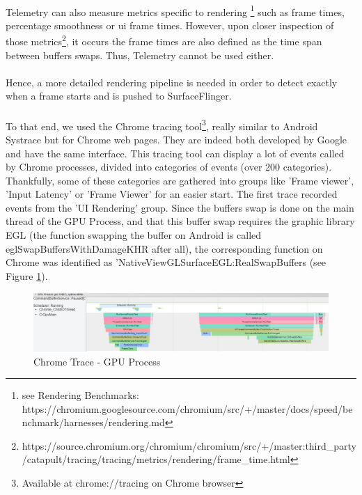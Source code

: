 \documentclass{kththesis}
\begin{document}
 \paragraph{}
 Telemetry can also measure metrics specific to rendering \footnote{see Rendering Benchmarks: https://chromium.googlesource.com/chromium/src/+/master/docs/speed/benchmark/harnesses/rendering.md} such as frame times, percentage smoothness or ui frame times. However, upon closer inspection of those metrics\footnote{https://source.chromium.org/chromium/chromium/src/+/master:third_party/catapult/tracing/tracing/metrics/rendering/frame_time.html}, it occurs the frame times are also defined as the time span between buffers swaps. Thus, Telemetry cannot be used either.
 
 \paragraph{}
 Hence, a more detailed rendering pipeline is needed in order to detect exactly when a frame starts and is pushed to SurfaceFlinger.
 
 \paragraph{}
 To that end, we used the Chrome tracing tool\footnote{Available at chrome://tracing on Chrome browser}, really similar to Android Systrace but for Chrome web pages. They are indeed both developed by Google and have the same interface. This tracing tool can display a lot of events called by Chrome processes, divided into categories of events (over 200 categories). Thankfully, some of these categories are gathered into groups like 'Frame viewer', 'Input Latency' or 'Frame Viewer' for an easier start. \newline
 The first trace recorded events from the 'UI Rendering' group. Since the buffers swap is done on the main thread of the GPU Process, and that this buffer swap requires the graphic library EGL (the function swapping the buffer on Android is called eglSwapBuffersWithDamageKHR after all), the corresponding function on Chrome was identified as 'NativeViewGLSurfaceEGL:RealSwapBuffers (see Figure \ref{fig:gpu_process}).
 
 \begin{figure}[!ht]
     \centering
     \includegraphics[width=13cm]{kththesis/Figures/trace_gpu_process.JPG}
     \caption{Chrome Trace - GPU Process}
     \label{fig:gpu_process}
 \end{figure}
 
\end{document}

